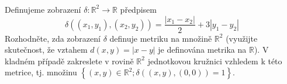 \subsubsection{}
Definujeme zobrazení $\delta : \mathbb{R}^{2}\rightarrow \mathbb{R}$ předpisem
$$\delta ((x_{1},y_{1}),(x_{2},y_{2}))=\frac{\left | x_{1}-x_{2} \right
|}{2}+3\left | y_{1}-y_{2} \right |$$
Rozhodněte, zda zobrazení $\delta$ definuje metriku na množině $\mathbb{R}^2$
(využijte skutečnost, že vztahem $d(x,y) = \left | x-y \right |$ je definována
metrika na $\mathbb{R}$). V kladném případě zakreslete v rovině $\mathbb{R}^2$
jednotkovou kružnici vzhledem k této metrice, tj. množinu $\left \{ \left ( x,y
\right ) \in \mathbb{R}^{2};\delta((x,y),(0,0))=1\right \}$.
